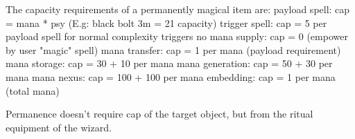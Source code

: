 The capacity requirements of a permanently magical item are:
payload spell: cap = mana * psy (E.g: black bolt 3m = 21 capacity)
trigger spell: cap = 5 per payload spell for normal complexity triggers
no mana supply: cap = 0 (empower by user "magic" spell)
mana transfer: cap = 1 per mana (payload requirement)
mana storage: cap = 30 + 10 per mana
mana generation: cap = 50 + 30 per mana
mana nexus: cap = 100 + 100 per mana
embedding: cap = 1 per mana (total mana)

Permanence doesn't require cap of the target object, but from the ritual equipment of the wizard.
